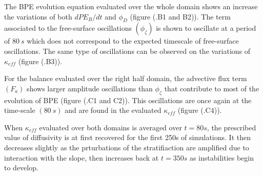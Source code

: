 The BPE evolution equation evaluated over the whole domain shows an increase the variations of both $dPE_B/dt$ and $\phi_D$ (figure (.B1 and B2)). The term associated to the free-surface oscillations $(\phi_{\zeta})$ is shown to oscillate at a period of $80\ s$ which does not correspond to the expected timescale of free-surface oscillations. The same type of oscillations can be observed on the variations of $\kappa_{eff}$ (figure (.B3)). 

For the balance evaluated over the right half domain, the advective flux term $(F_a)$ shows larger amplitude oscillations than $\phi_{\zeta}$ that contribute to most of the evolution of BPE (figure (.C1 and C2)). This oscillations are once again at the time-scale $(80\ s)$ and are found in the evaluated $\kappa_{eff}$ (figure (.C4)).

When $\kappa_{eff}$ evaluated over both domains is averaged over $t=80s$, the prescribed value of diffusivity is at first recovered for the first 250s of simulations. It then decreases slightly as the prturbations of the stratifiaction are amplified due to interaction with the slope, then increases back at $t=350s$ as instabilities begin to develop. 

